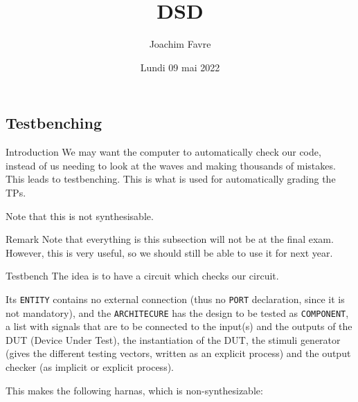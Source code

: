 \documentclass[a4paper]{article}
\title{DSD}
\author{Joachim Favre}
\date{Lundi 09 mai 2022}
\begin{document}
\maketitle


\subsection{Testbenching}
\begin{parag}{Introduction}
    We may want the computer to automatically check our code, instead of us needing to look at the waves and making thousands of mistakes. This leads to testbenching. This is what is used for automatically grading the TPs.

    Note that this is not synthesisable. 

    \begin{subparag}{Remark}
        Note that everything is this subsection will not be at the final exam. However, this is very useful, so we should still be able to use it for next year.
    \end{subparag}
\end{parag}

\begin{parag}{Testbench}
    The idea is to have a circuit which checks our circuit. 

    Its \texttt{ENTITY} contains no external connection (thus no \texttt{PORT} declaration, since it is not mandatory), and the \texttt{ARCHITECURE} has the design to be tested as \texttt{COMPONENT}, a list with signals that are to be connected to the input(s) and the outputs of the DUT (Device Under Test), the instantiation of the DUT, the stimuli generator (gives the different testing vectors, written as an explicit process) and the output checker (as implicit or explicit process). 

    This makes the following harnas, which is non-synthesizable:
\end{parag}
\end{document}
